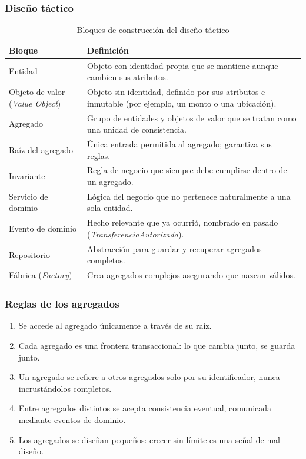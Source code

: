 \documentclass[11pt,a4paper]{article}
\begin{document}
	\subsubsection{Diseño táctico}
	\begin{table}[H]
		\centering
		\caption{Bloques de construcción del diseño táctico}
		\small
		\begin{tabularx}{\textwidth}{>{\raggedright\arraybackslash}p{4.2cm}Y}
			\toprule
			\textbf{Bloque} & \textbf{Definición} \\
			\midrule
			Entidad & Objeto con identidad propia que se mantiene aunque cambien sus atributos. \\
			Objeto de valor (\textit{Value Object}) & Objeto sin identidad, definido por sus atributos e inmutable (por ejemplo, un monto o una ubicación). \\
			Agregado & Grupo de entidades y objetos de valor que se tratan como una unidad de consistencia. \\
			Raíz del agregado & Única entrada permitida al agregado; garantiza sus reglas. \\
			Invariante & Regla de negocio que siempre debe cumplirse dentro de un agregado. \\
			Servicio de dominio & Lógica del negocio que no pertenece naturalmente a una sola entidad. \\
			Evento de dominio & Hecho relevante que ya ocurrió, nombrado en pasado (\textit{TransferenciaAutorizada}). \\
			Repositorio & Abstracción para guardar y recuperar agregados completos. \\
			Fábrica (\textit{Factory}) & Crea agregados complejos asegurando que nazcan válidos. \\
			\bottomrule
		\end{tabularx}
	\end{table}
	
	\subsubsection{Reglas de los agregados}
	\begin{enumerate}[leftmargin=2em]
		\item Se accede al agregado únicamente a través de su raíz.
		\item Cada agregado es una frontera transaccional: lo que cambia junto, se guarda junto.
		\item Un agregado se refiere a otros agregados solo por su identificador, nunca incrustándolos completos.
		\item Entre agregados distintos se acepta consistencia eventual, comunicada mediante eventos de dominio.
		\item Los agregados se diseñan pequeños: crecer sin límite es una señal de mal diseño.
	\end{enumerate}
	
\end{document}

